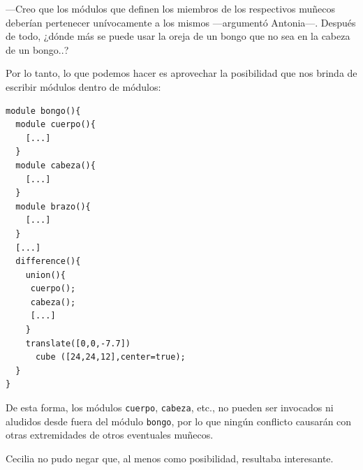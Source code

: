 ---Creo que los módulos que definen los miembros de los respectivos
muñecos deberían pertenecer unívocamente a los mismos
---ar\-gu\-men\-tó Antonia---. Después de todo, ¿dónde más se puede
usar la oreja de un bongo que no sea en la cabeza de un bongo..?

\guillemotright Por lo tanto, lo que podemos hacer es aprovechar la
posibilidad que nos brinda \openscad{} de escribir módulos dentro de
módulos:

\begin{lstlisting}  
module bongo(){
  module cuerpo(){
    [...]
  }
  module cabeza(){
    [...]
  }
  module brazo(){
    [...]
  }
  [...]    
  difference(){
    union(){
     cuerpo();
     cabeza();
     [...]    
    }
    translate([0,0,-7.7])
      cube ([24,24,12],center=true);
  }
}
\end{lstlisting}

\guillemotright De esta forma, los módulos \texttt{cuerpo},
\texttt{cabeza}, etc., no pueden ser invocados ni aludidos desde fuera
del módulo \texttt{bongo}, por lo que ningún conflicto causarán con
otras extremidades de otros eventuales muñecos.

Cecilia no pudo negar que, al menos como posibilidad, resultaba
interesante.

  

